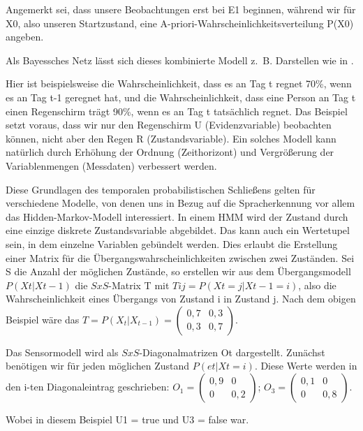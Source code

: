 Angemerkt sei, dass unsere Beobachtungen erst bei E1 beginnen, während wir für X0, also unseren Startzustand, eine A-priori-Wahrscheinlichkeitsverteilung P(X0) angeben.

Als Bayessches Netz lässt sich dieses kombinierte Modell z.~B. Darstellen wie in \cite[S. 665]{russelnorvig}.

Hier ist beispielsweise die Wahrscheinlichkeit, dass es an Tag t regnet 70\%, wenn es an Tag t-1 geregnet hat, und die Wahrscheinlichkeit, dass eine Person an Tag t einen Regenschirm trägt 90\%, wenn es an Tag t tatsächlich regnet.
Das Beispiel setzt voraus, dass wir nur den Regenschirm U (Evidenzvariable) beobachten können, nicht aber den Regen R (Zustandsvariable).
Ein solches Modell kann natürlich durch Erhöhung der Ordnung (Zeithorizont) und Vergrößerung der Variablenmengen (Messdaten) verbessert werden.

Diese Grundlagen des temporalen probabilistischen Schließens gelten für verschiedene Modelle, von denen uns in Bezug auf die Spracherkennung vor allem das Hidden-Markov-Modell interessiert.
In einem HMM wird der Zustand durch eine einzige diskrete Zustandsvariable abgebildet.
Das kann auch ein Wertetupel sein, in dem einzelne Variablen gebündelt werden.
Dies erlaubt die Erstellung einer Matrix für die Übergangswahrscheinlichkeiten zwischen zwei Zuständen.
Sei S die Anzahl der möglichen Zustände, so erstellen wir aus dem Übergangsmodell $P( Xt | Xt-1 )$ die $S x S$-Matrix T mit $Tij = P(Xt = j | Xt-1 = i)$, also die Wahrscheinlichkeit eines Übergangs von Zustand i in Zustand j.
Nach dem obigen Beispiel wäre das $T = P(X_t | X_{t-1}) =
\begin{pmatrix}
0,7 & 0,3 \\
0,3 & 0,7
\end{pmatrix}$.

Das Sensormodell wird als $S x S$-Diagonalmatrizen Ot dargestellt.
Zunächst benötigen wir für jeden möglichen Zustand $P( et | Xt = i )$.
Diese Werte werden in den i-ten Diagonaleintrag geschrieben:
$O_1 = \begin{pmatrix}
0,9 & 0 \\
0 & 0,2
\end{pmatrix}$;
$O_3 = \begin{pmatrix}
0,1 & 0 \\
0 & 0,8
\end{pmatrix}$.

Wobei in diesem Beispiel U1 = true und U3 = false war.

